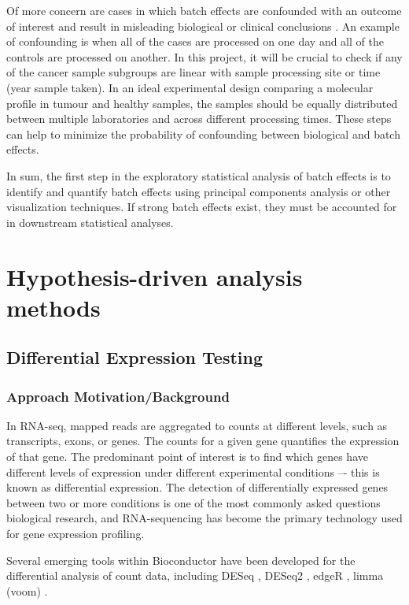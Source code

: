 Of more concern are cases in which batch effects are confounded with an outcome of interest and result in misleading biological or clinical conclusions \cite{Leek2010}. An example of confounding is when all of the cases are processed on one day and all of the controls are processed on another. In this project, it will be crucial to check if any of the cancer sample subgroups are linear with sample processing site or time (year sample taken). In an ideal experimental design comparing a molecular profile in tumour and healthy samples, the samples should be equally distributed between multiple laboratories and across different processing times. These steps can help to minimize the probability of confounding between biological and batch effects.
 
In sum, the first step in the exploratory statistical analysis of batch effects is to identify and quantify batch effects using principal components analysis or other visualization techniques. If strong batch effects exist, they must be accounted for in downstream statistical analyses. 

 


\section{Hypothesis-driven analysis methods}    




    \subsection{Differential Expression Testing}
    \subsubsection{Approach Motivation/Background}
    In RNA-seq, mapped reads are aggregated to counts at different levels, such as transcripts, exons, or genes. The counts for a given gene quantifies the expression of that gene. The predominant point of interest is to find which genes have different levels of expression under different experimental conditions –- this is known as differential expression.
    The detection of differentially expressed genes between two or more conditions is one of the most commonly asked questions biological research, and RNA-sequencing has become the primary technology used for gene expression profiling.

    Several emerging tools within Bioconductor have been developed for the differential analysis of count data, including DESeq \cite{}, DESeq2 \cite{}, edgeR \cite{Robinson2010EdgeR:Data}, limma (voom) \cite{Ritchie2015LimmaStudies}.

